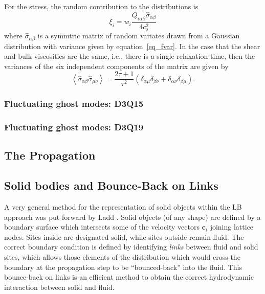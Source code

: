 For the stress, the random contribution to the distributions is
\begin{equation}
\xi_i = w_i \frac{Q_{i\alpha\beta} \hat{\sigma}_{\alpha\beta}}{4c_s^2}
\end{equation}
where $\hat{\sigma}_{\alpha\beta}$ is a symmtric matrix of random
variates drawn from a Gaussian distribution with variance given
by equation~\ref{eq_fvar}. In the case that the shear and bulk
viscosities are the same, i.e., there is a single relaxation
time, then the variances of the six independent components of
the matrix are given by
\begin{equation}
\left< \hat{\sigma}_{\alpha\beta} \hat{\sigma}_{\mu\nu} \right> =
\frac{2\tau + 1}{\tau^2}
(\delta_{\alpha\mu}\delta_{\beta\nu} + \delta_{\alpha\nu} \delta_{\beta\mu}).
\end{equation}


\subsubsection{Fluctuating ghost modes: D3Q15}

\subsubsection{Fluctuating ghost modes: D3Q19}



\subsection{The Propagation}



\subsection{Solid bodies and Bounce-Back on Links}

A very general method for the representation of solid objects
within the LB approach was put forward by Ladd \cite{l94a, l94b}.
Solid objects (of any shape) are defined by a boundary surface
which intersects some of the velocity vectors $\mathbf{c}_i$
joining lattice nodes. Sites inside are designated solid, while
sites outside remain fluid. The correct boundary condition is
defined by identifying \textit{links} between fluid and solid
sites, which allows those elements of the distribution which would
cross the boundary at the propagation step to be ``bounced-back''
into the fluid. This bounce-back on links is an efficient method
to obtain the  correct hydrodynamic interaction between solid
and fluid.

